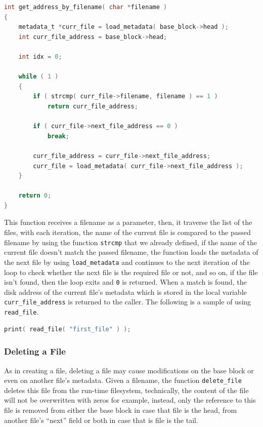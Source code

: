 \begin{lstlisting}[language=C]
int get_address_by_filename( char *filename )
{
    metadata_t *curr_file = load_metadata( base_block->head );
    int curr_file_address = base_block->head;
    
    int idx = 0;
    
    while ( 1 )
    {
        if ( strcmp( curr_file->filename, filename ) == 1 )
            return curr_file_address;
            
        if ( curr_file->next_file_address == 0 )
            break;
        
        curr_file_address = curr_file->next_file_address;
        curr_file = load_metadata( curr_file->next_file_address );      
    }
    
    return 0;
}
\end{lstlisting}

This function receives a filename as a parameter, then, it traverse the
list of the files, with each iteration, the name of the current file is
compared to the passed filename by using the function \lstinline!strcmp!
that we already defined, if the name of the current file doesn't match
the passed filename, the function loads the metadata of the next file by
using \lstinline!load_metadata! and continues to the next iteration of
the loop to check whether the next file is the required file or not, and
so on, if the file isn't found, then the loop exits and \lstinline!0! is
returned. When a match is found, the disk address of the current file's
metadata which is stored in the local variable
\lstinline!curr_file_address! is returned to the caller. The following
is a sample of using \lstinline!read_file!.

\begin{lstlisting}[language=C]
print( read_file( "first_file" ) );
\end{lstlisting}

\subsubsection{Deleting a File}\label{deleting-a-file}

As in creating a file, deleting a file may cause modifications on the
base block or even on another file's metadata. Given a filename, the
function \lstinline!delete_file! deletes this file from the run-time
filesystem, technically, the content of the file will not be overwritten
with zeros for example, instead, only the reference to this file is
removed from either the base block in case that file is the head, from
another file's ``next'' field or both in case that is file is the tail.

